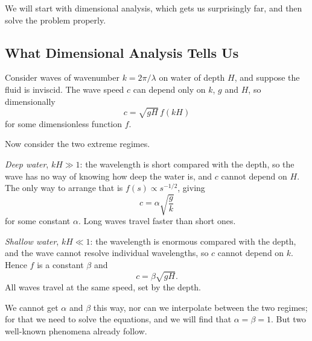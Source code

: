 \begin{center}
\end{center}

We will start with dimensional analysis, which gets us surprisingly far, and then solve the problem properly.

\subsection{What Dimensional Analysis Tells Us}

Consider waves of wavenumber $k = 2\pi/\lambda$ on water of depth $H$, and suppose the fluid is inviscid. The wave speed $c$ can depend only on $k$, $g$ and $H$, so dimensionally
$$
c = \sqrt{gH}\, f(kH)
$$
for some dimensionless function $f$.

Now consider the two extreme regimes.

\emph{Deep water}, $kH \gg 1$: the wavelength is short compared with the depth, so the wave has no way of knowing how deep the water is, and $c$ cannot depend on $H$. The only way to arrange that is $f(s) \propto s^{-1/2}$, giving
$$
c = \alpha\sqrt{\frac{g}{k}}
$$
for some constant $\alpha$. Long waves travel faster than short ones.

\emph{Shallow water}, $kH \ll 1$: the wavelength is enormous compared with the depth, and the wave cannot resolve individual wavelengths, so $c$ cannot depend on $k$. Hence $f$ is a constant $\beta$ and
$$
c = \beta\sqrt{gH}.
$$
All waves travel at the same speed, set by the depth.

We cannot get $\alpha$ and $\beta$ this way, nor can we interpolate between the two regimes; for that we need to solve the equations, and we will find that $\alpha = \beta = 1$. But two well-known phenomena already follow.

